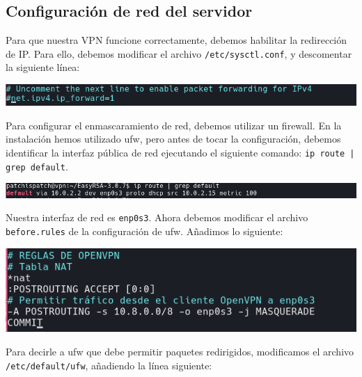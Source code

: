 \documentclass[11pt,a4paper]{article}
\begin{document}
\subsection{Configuración de red del servidor}

Para que nuestra VPN funcione correctamente, debemos habilitar la redirección de IP. Para ello, debemos modificar el archivo \texttt{/etc/sysctl.conf}, y descomentar la siguiente línea:

\medskip

\begin{center}
\includegraphics[scale=0.4]{ipv4-ip.png}
\end{center}

\medskip

Para configurar el enmascaramiento de red, debemos utilizar un firewall. En la instalación hemos utilizado ufw, pero antes de tocar la configuración, debemos identificar la interfaz pública de red ejecutando el siguiente comando: \texttt{ip route | grep default}.

\medskip

\begin{center}
\includegraphics[scale=0.4]{ip-route-grep.png}
\end{center}

\medskip

Nuestra interfaz de red es \texttt{enp0s3}. Ahora debemos modificar el archivo \texttt{before.rules} de la configuración de ufw. Añadimos lo siguiente:

\medskip

\begin{center}
\includegraphics[scale=0.4]{before-rules-vpn.png}
\end{center}

\medskip

Para decirle a ufw que debe permitir paquetes redirigidos, modificamos el archivo \texttt{/etc/default/ufw}, añadiendo la línea siguiente:
\end{document}
